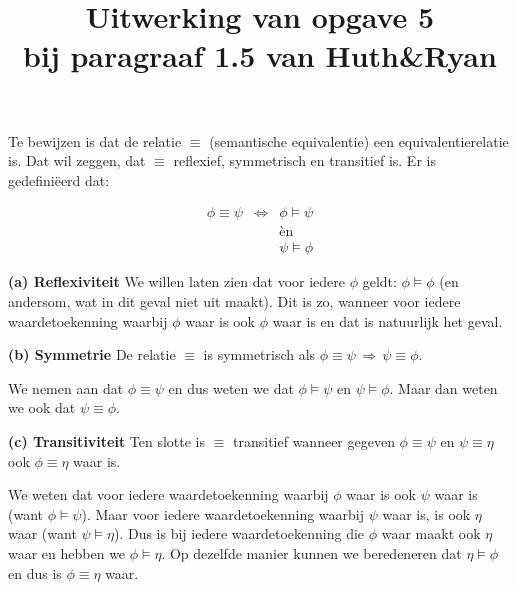 \documentclass[a4paper,11pt]{article}
\title{Uitwerking van opgave 5\\
\normalsize{bij paragraaf 1.5 van Huth\&Ryan}}
\date{}
\begin{document}
\maketitle


Te bewijzen is dat de relatie $\equiv$ (semantische equivalentie) een
equivalentierelatie is. Dat wil zeggen, dat $\equiv$ reflexief, symmetrisch
en transitief is. Er is gedefini\"eerd dat:

\begin{eqnarray*}
\phi \equiv \psi & \Longleftrightarrow & \phi \models \psi \\
                 &                     & \mbox{\`en} \\
                 &                     & \psi \models \phi
\end{eqnarray*}


\begin{description}

\item{\bf (a) Reflexiviteit}
We willen laten zien dat voor iedere $\phi$ geldt: $\phi \models \phi$ (en andersom, wat
in dit geval niet uit maakt). Dit is zo, wanneer voor iedere waardetoekenning waarbij
$\phi$ waar is ook $\phi$ waar is en dat is natuurlijk het geval.

\item{\bf (b) Symmetrie}
De relatie $\equiv$ is symmetrisch als $\phi \equiv \psi \, \Rightarrow \, \psi \equiv \phi$.

We nemen aan dat $\phi \equiv \psi$ en dus weten we dat $\phi \models \psi$ en
$\psi \models \phi$. Maar dan weten we ook dat $\psi \equiv \phi$.

\item{\bf (c) Transitiviteit}
Ten slotte is $\equiv$ transitief wanneer gegeven $\phi \equiv \psi$ en $\psi \equiv \eta$ ook
$\phi \equiv \eta$ waar is.

We weten dat voor iedere waardetoekenning waarbij $\phi$ waar is ook $\psi$ waar is (want
$\phi \models \psi$). Maar voor iedere waardetoekenning waarbij $\psi$ waar is, is ook $\eta$
waar (want $\psi \models \eta$). Dus is bij iedere waardetoekenning die $\phi$ waar maakt ook
$\eta$ waar en hebben we $\phi \models \eta$. Op dezelfde manier kunnen we beredeneren dat
$\eta \models \phi$ en dus is $\phi \equiv \eta$ waar.

\end{description}
\end{document}
